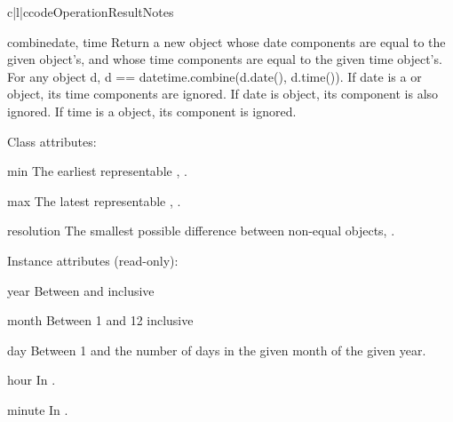 \begin{tableiii}{c|l|c}{code}{Operation}{Result}{Notes}
\begin{methoddesc}{combine}{date, time}
    Return a new  object whose date components are
    equal to the given  object's, and whose time components are
    equal to the given time object's.  For any  object
    d, d == datetime.combine(d.date(), d.time()).
    If date is a  or  object, its
    time components are ignored.  If date is 
    object, its  component is also ignored.  If time is
    a  object, its  component is ignored.
\end{methoddesc}

Class attributes:

\begin{memberdesc}{min}
        The earliest representable ,
        .
\end{memberdesc}

\begin{memberdesc}{max}
        The latest representable ,
        .
\end{memberdesc}

\begin{memberdesc}{resolution}
        The smallest possible difference between non-equal 
        objects, .
\end{memberdesc}

Instance attributes (read-only):

\begin{memberdesc}{year}
Between  and  inclusive
\end{memberdesc}

\begin{memberdesc}{month}
Between 1 and 12 inclusive
\end{memberdesc}

\begin{memberdesc}{day}
Between 1 and the number of days in the given month
                    of the given year.
\end{memberdesc}

\begin{memberdesc}{hour}
In .
\end{memberdesc}

\begin{memberdesc}{minute}
In .
\end{memberdesc}


\end{tableiii}
